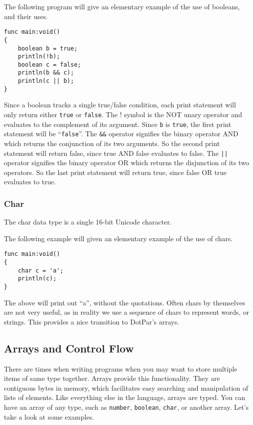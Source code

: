 \documentclass{article}
\begin{document}
The following program will give an elementary example of the use of booleans, and their uses.  

\begin{verbatim}
func main:void()
{
    boolean b = true;
    println(!b);
    boolean c = false;
    println(b && c);
    println(c || b);  
}
\end{verbatim}

Since a boolean tracks a single true/false condition, each print statement will only return either \verb!true! or \verb!false!.  The ! symbol is the NOT unary operator and evaluates to the complement of its argument.  Since \verb!b! is \verb!true!, the first print statement will be ``\verb!false!''.  The \verb!&&! operator signifies the binary operator AND which returns the conjunction of its two arguments.  So the second print statement will return false, since true AND false evaluates to false. The \verb!||! operator signifies the binary operator OR which returns the disjunction of its two operators.  So the last print statement will return true, since false OR true evaluates to true. 

\subsubsection{Char}
The char data type is a single 16-bit Unicode character. 

The following example will given an elementary example of the use of chars.

\begin{verbatim}
func main:void()
{
    char c = 'a';
    println(c);
}
\end{verbatim}

The above will print out ``a'', without the quotations. Often chars by themselves are not very useful, as in reality we use a sequence of chars to represent words, or strings.  This provides a nice transition to DotPar's arrays.

\subsection{Arrays and Control Flow}
There are times when writing programs when you may want to store multiple items of same type together. Arrays provide this functionality. They are contiguous bytes in memory, which facilitates easy searching and manipulation of lists of elements. Like everything else in the language, arrays are typed. You can have an array of any type, such as \verb!number!, \verb!boolean!, \verb!char!, or another array. Let's take a look at some examples.
\end{document}
